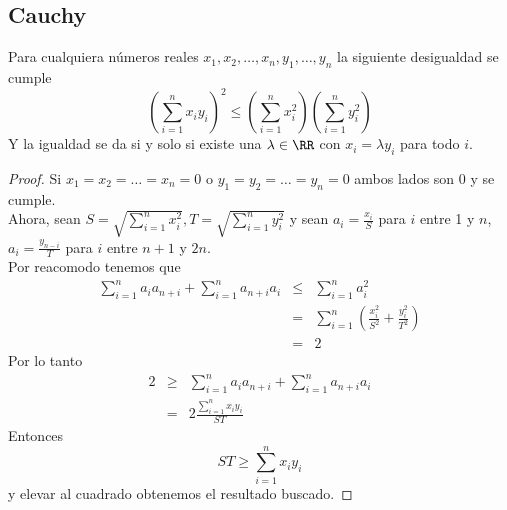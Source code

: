 \documentclass[11pt]{scrartcl}
\begin{document}
\subsection{Cauchy}
\begin{theorem} 
    Para cualquiera n\'umeros reales $x_1,x_2,\ldots, x_n, y_1,\ldots,y_n$ la siguiente desigualdad se cumple
    \[ \left( \sum_{i=1}^n x_iy_i \right)^2 \leq \left(\sum_{i=1}^n x_i^2 \right)\left(\sum_{i=1}^n y_i^2\right)\]
    Y la igualdad se da si y solo si existe una $\lambda \in \RR$ con $x_i=\lambda y_i$ para todo $i$.  
\end{theorem}
\begin{proof}
Si $x_1=x_2=\ldots=x_n=0$ o $y_1=y_2=\ldots=y_n=0$ ambos lados son 0 y se cumple.\\
Ahora, sean $S=\sqrt{\sum_{i=1}^n x_i^2}, T=\sqrt{\sum_{i=1}^n y_i^2}$ y sean $a_i=\frac{x_i}{S}$ para $i$ entre 1 y $n$, $a_i=\frac{y_{n-i}}{T}$ para $i$ entre $n+1$ y $2n$. \\
Por reacomodo tenemos que 
\begin{eqnarray*}
\sum_{i=1}^n a_ia_{n+i} + \sum_{i=1}^n a_{n+i}a_i &\leq& \sum_{i=1}^n a_i^2 \\
&=& \sum_{i=1}^n \left(\frac{x_i^2}{S^2}+\frac{y_i^2}{T^2}\right) \\
&=& 2
\end{eqnarray*}
Por lo tanto
\begin{eqnarray*}
    2 &\geq& \sum_{i=1}^n a_ia_{n+i} + \sum_{i=1}^n a_{n+i}a_i\\
    &=& 2\frac{\sum_{i=1}^n x_iy_i}{ST}
\end{eqnarray*}
Entonces 
\[ ST \geq \sum_{i=1}^n x_iy_i\]
y elevar al cuadrado obtenemos el resultado buscado.
\end{proof}
\end{document}
